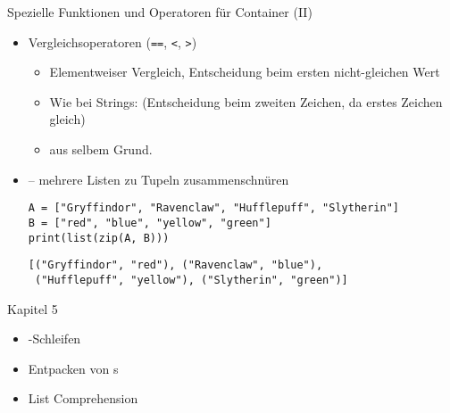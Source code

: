 
\begin{frame}[fragile]{Spezielle Funktionen und Operatoren für Container (II)}
%
\begin{itemize}
\item Vergleichsoperatoren (\texttt{==}, \texttt{<}, \texttt{>})
	\begin{itemize}
	\item Elementweiser Vergleich, Entscheidung beim ersten nicht-gleichen Wert
	\item Wie bei Strings:  (Entscheidung beim zweiten Zeichen, da erstes Zeichen gleich)
	\item \inPy{[1, 5, 7] < [1, 5, 9, -3]} aus selbem Grund.
	\end{itemize}
\item {} -- mehrere Listen zu Tupeln zusammenschnüren\\
	\begin{codebox}
	\begin{verbatim}
A = ["Gryffindor", "Ravenclaw", "Hufflepuff", "Slytherin"]
B = ["red", "blue", "yellow", "green"]
print(list(zip(A, B)))
	\end{verbatim}
	\end{codebox}
	\begin{cmdbox}
	\begin{verbatim}
[("Gryffindor", "red"), ("Ravenclaw", "blue"),
 ("Hufflepuff", "yellow"), ("Slytherin", "green")]
	\end{verbatim}
	\end{cmdbox}
\end{itemize}
%
\end{frame}


\begin{frame}{Kapitel 5}
%
\begin{itemize}
\item {}-Schleifen
\item Entpacken von s
\item List Comprehension
\end{itemize}
%
\end{frame}


